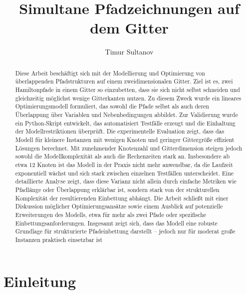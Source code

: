 \documentclass[bachelor, german]{algothesis}
\title{Simultane Pfadzeichnungen auf dem Gitter} %
\author{Timur Sultanov} %
\begin{document}
\begin{abstract}
Diese Arbeit beschäftigt sich mit der Modellierung und Optimierung von überlappenden Pfadstrukturen auf einem zweidimensionalen Gitter. Ziel ist es, zwei Hamiltonpfade in einem Gitter so einzubetten, dass sie sich nicht selbst schneiden und gleichzeitig möglichst wenige Gitterkanten nutzen. Zu diesem Zweck wurde ein lineares Optimierungsmodell formuliert, das sowohl die Pfade selbst als auch deren Überlappung über Variablen und Nebenbedingungen abbildet. Zur Validierung wurde ein Python-Skript entwickelt, das automatisiert Testfälle erzeugt und die Einhaltung der Modellrestriktionen überprüft.\newline 
Die experimentelle Evaluation zeigt, dass das Modell für kleinere Instanzen mit wenigen Knoten und geringer Gittergröße effizient Lösungen berechnet. Mit zunehmender Knotenzahl und Gitterdimension steigen jedoch sowohl die Modellkomplexität als auch die Rechenzeiten stark an. Insbesondere ab etwa 12 Knoten ist das Modell in der Praxis nicht mehr anwendbar, da die Laufzeit exponentiell wächst und sich stark zwischen einzelnen Testfällen unterscheidet. Eine detaillierte Analyse zeigt, dass diese Varianz nicht allein durch einfache Metriken wie Pfadlänge oder Überlappung erklärbar ist, sondern stark von der strukturellen Komplexität der resultierenden Einbettung abhängt.\newline 
Die Arbeit schließt mit einer Diskussion möglicher Optimierungsansätze sowie einem Ausblick auf potenzielle Erweiterungen des Modells, etwa für mehr als zwei Pfade oder spezifische Einbettungsanforderungen. Insgesamt zeigt sich, dass das Modell eine robuste Grundlage für strukturierte Pfadeinbettung darstellt – jedoch nur für moderat große Instanzen praktisch einsetzbar ist
\end{abstract}

\thesistableofcontents

\chapter{Einleitung}
\end{document}
